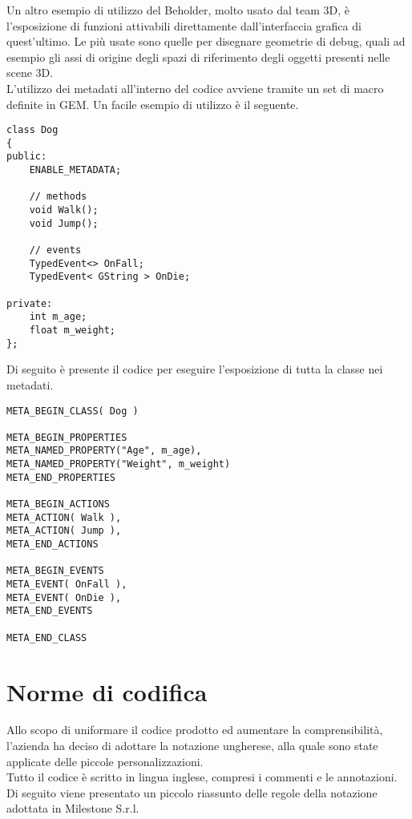Un altro esempio di utilizzo del Beholder, molto usato dal team 3D, è l'esposizione di funzioni attivabili direttamente dall'interfaccia grafica di quest'ultimo. Le più usate sono quelle per disegnare geometrie di debug, quali ad esempio gli assi di origine degli spazi di riferimento degli oggetti presenti nelle scene 3D.\\

L'utilizzo dei metadati all'interno del codice avviene tramite un set di macro definite in GEM. Un facile esempio di utilizzo è il seguente.

\begin{lstlisting}[style=maurizio-code]
class Dog
{
public:
	ENABLE_METADATA;

	// methods
	void Walk();
	void Jump();

	// events
	TypedEvent<> OnFall;
	TypedEvent< GString > OnDie;

private:
	int m_age;
	float m_weight;
};
\end{lstlisting}

Di seguito è presente il codice per eseguire l'esposizione di tutta la classe nei metadati.

\begin{lstlisting}[style=maurizio-code]
META_BEGIN_CLASS( Dog )

META_BEGIN_PROPERTIES
META_NAMED_PROPERTY("Age", m_age),
META_NAMED_PROPERTY("Weight", m_weight)
META_END_PROPERTIES

META_BEGIN_ACTIONS
META_ACTION( Walk ),
META_ACTION( Jump ),
META_END_ACTIONS

META_BEGIN_EVENTS
META_EVENT( OnFall ),
META_EVENT( OnDie ),
META_END_EVENTS

META_END_CLASS
\end{lstlisting}

\section{Norme di codifica}

Allo scopo di uniformare il codice prodotto ed aumentare la comprensibilità, l'azienda ha deciso di adottare la notazione ungherese, alla quale sono state applicate delle piccole personalizzazioni.\\

Tutto il codice è scritto in lingua inglese, compresi i commenti e le annotazioni. Di seguito viene presentato un piccolo riassunto delle regole della notazione adottata in Milestone S.r.l.\\

